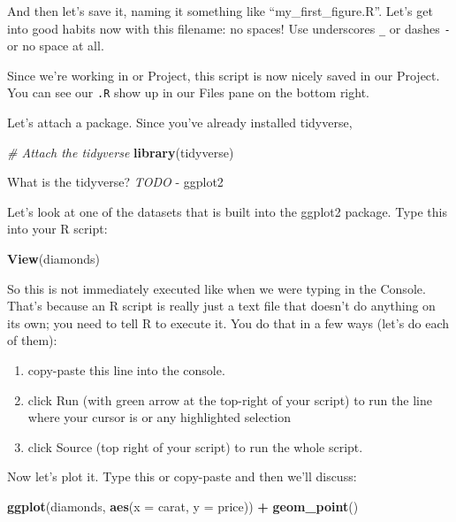 \documentclass[]{book}
\newenvironment{Shaded}{\begin{snugshade}}{\end{snugshade}}
\newcommand{\CommentTok}[1]{\textcolor[rgb]{0.56,0.35,0.01}{\textit{#1}}}
\newcommand{\DataTypeTok}[1]{\textcolor[rgb]{0.13,0.29,0.53}{#1}}
\newcommand{\KeywordTok}[1]{\textcolor[rgb]{0.13,0.29,0.53}{\textbf{#1}}}
\newcommand{\NormalTok}[1]{#1}
\newcommand{\OperatorTok}[1]{\textcolor[rgb]{0.81,0.36,0.00}{\textbf{#1}}}
\newcommand{\StringTok}[1]{\textcolor[rgb]{0.31,0.60,0.02}{#1}}
\providecommand{\tightlist}{%
  \setlength{\itemsep}{0pt}\setlength{\parskip}{0pt}}
\begin{document}
And then let's save it, naming it something like ``my\_first\_figure.R''. Let's get into good habits now with this filename: no spaces! Use underscores \texttt{\_} or dashes \texttt{-} or no space at all.

Since we're working in or Project, this script is now nicely saved in our Project. You can see our \texttt{.R} show up in our Files pane on the bottom right.

Let's attach a package. Since you've already installed tidyverse,

\begin{Shaded}
\begin{Highlighting}[]
\CommentTok{# Attach the tidyverse}
\KeywordTok{library}\NormalTok{(tidyverse)}
\end{Highlighting}
\end{Shaded}

What is the tidyverse? \emph{TODO}
- ggplot2

Let's look at one of the datasets that is built into the ggplot2 package. Type this into your R script:

\begin{Shaded}
\begin{Highlighting}[]
\KeywordTok{View}\NormalTok{(diamonds)}
\end{Highlighting}
\end{Shaded}

So this is not immediately executed like when we were typing in the Console. That's because an R script is really just a text file that doesn't do anything on its own; you need to tell R to execute it. You do that in a few ways (let's do each of them):

\begin{enumerate}
\def\labelenumi{\arabic{enumi}.}
\tightlist
\item
  copy-paste this line into the console.
\item
  click Run (with green arrow at the top-right of your script) to run the line where your cursor is or any highlighted selection
\item
  click Source (top right of your script) to run the whole script.
\end{enumerate}

Now let's plot it. Type this or copy-paste and then we'll discuss:

\begin{Shaded}
\begin{Highlighting}[]
\KeywordTok{ggplot}\NormalTok{(diamonds, }\KeywordTok{aes}\NormalTok{(}\DataTypeTok{x =}\NormalTok{ carat, }\DataTypeTok{y =}\NormalTok{ price)) }\OperatorTok{+}
\StringTok{  }\KeywordTok{geom_point}\NormalTok{()}
\end{Highlighting}
\end{Shaded}
\end{document}

